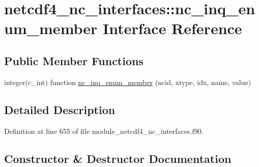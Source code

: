 \hypertarget{interfacenetcdf4__nc__interfaces_1_1nc__inq__enum__member}{}\section{netcdf4\+\_\+nc\+\_\+interfaces\+:\+:nc\+\_\+inq\+\_\+enum\+\_\+member Interface Reference}
\label{interfacenetcdf4__nc__interfaces_1_1nc__inq__enum__member}
\subsection*{Public Member Functions}
\begin{DoxyCompactItemize}
\item 
integer(c\+\_\+int) function \hyperlink{interfacenetcdf4__nc__interfaces_1_1nc__inq__enum__member_a7b97004306ef6541cdb4394f7d192ccd}{nc\+\_\+inq\+\_\+enum\+\_\+member} (ncid, xtype, idx, name, value)
\end{DoxyCompactItemize}


\subsection{Detailed Description}


Definition at line 655 of file module\+\_\+netcdf4\+\_\+nc\+\_\+interfaces.\+f90.



\subsection{Constructor \& Destructor Documentation}
\mbox{\label{interfacenetcdf4__nc__interfaces_1_1nc__inq__enum__member_a7b97004306ef6541cdb4394f7d192ccd}} 
